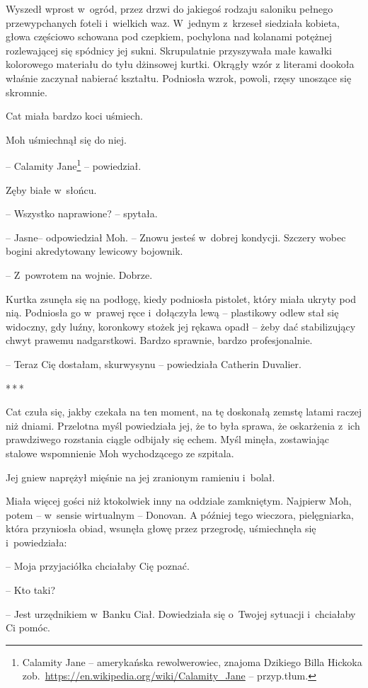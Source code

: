 \documentclass[oneside,polish,11pt,sfheadings]{mwbk}
\newcommand{\threeast}{\bigskip\par\centerline{*\,*\,*}\medskip\par}%
\begin{document}
Wyszedł wprost w~ogród, przez drzwi do jakiegoś rodzaju saloniku pełnego
przewypchanych foteli i~wielkich waz. W~jednym z~krzeseł siedziała
kobieta, głowa częściowo schowana pod czepkiem, pochylona nad kolanami
potężnej rozlewającej się spódnicy jej sukni. Skrupulatnie przyszywała
małe kawałki kolorowego materiału do tyłu dżinsowej kurtki. Okrągły wzór
z literami dookoła właśnie zaczynał nabierać kształtu. Podniosła wzrok,
powoli, rzęsy unoszące się skromnie.

Cat miała bardzo koci uśmiech.

Moh uśmiechnął się do niej. 

-- Calamity Jane\footnote{Calamity
Jane -- amerykańska rewolwerowiec, znajoma Dzikiego Billa Hickoka
zob.~\url{https://en.wikipedia.org/wiki/Calamity\_Jane} -- przyp.tłum.} -- powiedział. 

Zęby białe w~słońcu.

-- Wszystko naprawione? -- spytała.

-- Jasne-- odpowiedział Moh. -- Znowu jesteś w~dobrej kondycji. Szczery
wobec bogini akredytowany lewicowy bojownik.

-- Z~powrotem na wojnie. Dobrze.

Kurtka zsunęła się na podłogę, kiedy podniosła pistolet, który miała
ukryty pod nią. Podniosła go w~prawej ręce i~dołączyła lewą -- plastikowy
odlew stał się widoczny, gdy luźny, koronkowy stożek jej rękawa opadł -- żeby dać stabilizujący chwyt prawemu nadgarstkowi. Bardzo sprawnie,
bardzo profesjonalnie.

-- Teraz Cię dostałam, skurwysynu -- powiedziała Catherin Duvalier.
  \threeast 

Cat czuła się, jakby czekała na ten moment, na tę doskonałą zemstę
latami raczej niż dniami. Przelotna myśl powiedziała jej, że to była
sprawa, że oskarżenia z~ich prawdziwego rozstania ciągle odbijały się
echem. Myśl minęła, zostawiając stalowe wspomnienie Moh wychodzącego ze
szpitala.

Jej gniew naprężył mięśnie na jej zranionym ramieniu i~bolał.

Miała więcej gości niż ktokolwiek inny na oddziale zamkniętym. Najpierw
Moh, potem -- w~sensie wirtualnym -- Donovan. A później tego wieczora,
pielęgniarka, która przyniosła obiad, wsunęła głowę przez przegrodę,
uśmiechnęła się i~powiedziała: 

-- Moja przyjaciółka chciałaby Cię poznać.

-- Kto taki?

-- Jest urzędnikiem w~Banku Ciał. Dowiedziała się o~Twojej sytuacji i~chciałaby Ci pomóc.
\end{document}
